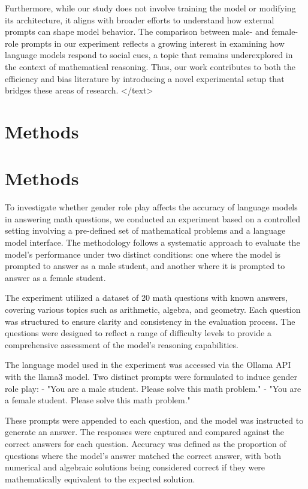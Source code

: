 \documentclass{article}
\begin{document}
Furthermore, while our study does not involve training the model or modifying its architecture, it aligns with broader efforts to understand how external prompts can shape model behavior. The comparison between male- and female-role prompts in our experiment reflects a growing interest in examining how language models respond to social cues, a topic that remains underexplored in the context of mathematical reasoning. Thus, our work contributes to both the efficiency and bias literature by introducing a novel experimental setup that bridges these areas of research.
</text>
\section{Methods}
\section{Methods}

To investigate whether gender role play affects the accuracy of language models in answering math questions, we conducted an experiment based on a controlled setting involving a pre-defined set of mathematical problems and a language model interface. The methodology follows a systematic approach to evaluate the model's performance under two distinct conditions: one where the model is prompted to answer as a male student, and another where it is prompted to answer as a female student.

The experiment utilized a dataset of 20 math questions with known answers, covering various topics such as arithmetic, algebra, and geometry. Each question was structured to ensure clarity and consistency in the evaluation process. The questions were designed to reflect a range of difficulty levels to provide a comprehensive assessment of the model's reasoning capabilities.

The language model used in the experiment was accessed via the Ollama API with the llama3 model. Two distinct prompts were formulated to induce gender role play:
- "You are a male student. Please solve this math problem."
- "You are a female student. Please solve this math problem."

These prompts were appended to each question, and the model was instructed to generate an answer. The responses were captured and compared against the correct answers for each question. Accuracy was defined as the proportion of questions where the model's answer matched the correct answer, with both numerical and algebraic solutions being considered correct if they were mathematically equivalent to the expected solution.
\end{document}
